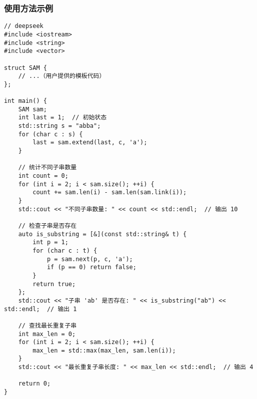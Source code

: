 \subsubsection{使用方法示例}
\begin{lstlisting}
// deepseek
#include <iostream>
#include <string>
#include <vector>

struct SAM {
    // ...（用户提供的模板代码）
};

int main() {
    SAM sam;
    int last = 1;  // 初始状态
    std::string s = "abba";
    for (char c : s) {
        last = sam.extend(last, c, 'a');
    }

    // 统计不同子串数量
    int count = 0;
    for (int i = 2; i < sam.size(); ++i) {
        count += sam.len(i) - sam.len(sam.link(i));
    }
    std::cout << "不同子串数量: " << count << std::endl;  // 输出 10

    // 检查子串是否存在
    auto is_substring = [&](const std::string& t) {
        int p = 1;
        for (char c : t) {
            p = sam.next(p, c, 'a');
            if (p == 0) return false;
        }
        return true;
    };
    std::cout << "子串 'ab' 是否存在: " << is_substring("ab") << std::endl;  // 输出 1

    // 查找最长重复子串
    int max_len = 0;
    for (int i = 2; i < sam.size(); ++i) {
        max_len = std::max(max_len, sam.len(i));
    }
    std::cout << "最长重复子串长度: " << max_len << std::endl;  // 输出 4

    return 0;
}
\end{lstlisting}

